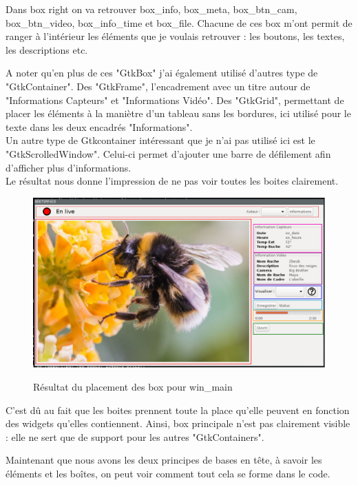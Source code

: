 \documentclass[11pt,french,a4paper]{report}
\begin{document}
Dans box right on va retrouver box\_info, box\_meta, box\_btn\_cam, box\_btn\_video, box\_info\_time et box\_file. 
Chacune de ces box m'ont permit de ranger à l'intérieur les éléments que je voulais retrouver : 
les boutons, les textes, les descriptions etc. 

A noter qu'en plus de ces "GtkBox" j'ai également utilisé d'autres type de "GtkContainer". Des "GtkFrame", l'encadrement
avec un titre autour de "Informations Capteurs" et "Informations Vidéo". Des "GtkGrid", permettant de placer les éléments 
à la maniètre d'un tableau sans les bordures, ici utilisé pour le texte dans les deux encadrés "Informations". \\
Un autre type de Gtkcontainer intéressant que je n'ai pas utilisé ici est le "GtkScrolledWindow". Celui-ci permet d'ajouter
une barre de défilement afin d'afficher plus d'informations. \\
Le résultat nous donne l'impression de ne pas voir toutes les boites clairement. \\
\begin{figure}[!h]
    \centering
        \includegraphics[scale=0.45]{../images/dia/schema_bloc_win_applique.png} \\
        \caption{Résultat du placement des box pour win\_main}
        \label{res_box_win_main}
\end{figure}

C'est dû au fait que les boites prennent toute la place qu'elle peuvent en fonction des widgets qu'elles contiennent. Ainsi, box principale 
n'est pas clairement visible : elle ne sert que de support pour les autres "GtkContainers". 

Maintenant que nous avons les deux principes de bases en tête, à savoir les éléments et les boîtes, on peut voir comment 
tout cela se forme dans le code. \\
\end{document}
